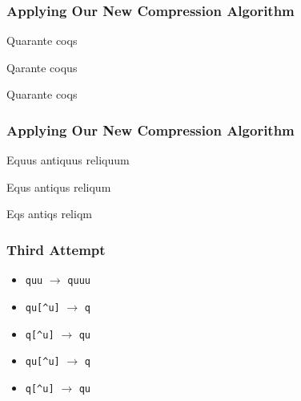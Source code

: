 \begin{frame}
  \frametitle{Applying Our New Compression Algorithm}
  \begin{center}
    Quarante coqs
  \end{center}
  \vskip5mm
  \begin{center}
    Qarante coqus
  \end{center}
  \vskip5mm
  \begin{center}
    Quarante coqs
  \end{center}
  \begin{center}
  \end{center}
\end{frame}

\begin{frame}
  \frametitle{Applying Our New Compression Algorithm}
  \begin{center}
    Equus antiquus reliquum
  \end{center}
  \vskip5mm
  \begin{center}
    Equs antiqus reliqum
  \end{center}
  \vskip5mm
  \begin{center}
    Eqs antiqs reliqm
  \end{center}
  \begin{center}
  \end{center}
\end{frame}

\begin{frame}
  \frametitle{Third Attempt}
  \begin{itemize}
    \item {\tt quu} $\rightarrow$ {\tt quuu}
    \item {\tt qu[\^{}u]} $\rightarrow$ {\tt q}
    \item {\tt q[\^{}u]} $\rightarrow$ {\tt qu}
  \end{itemize}
  \vskip5mm
  \begin{itemize}
    \item {\tt qu[\^{}u]} $\rightarrow$ {\tt q}
    \item {\tt q[\^{}u]} $\rightarrow$ {\tt qu}
  \end{itemize}
\end{frame}

